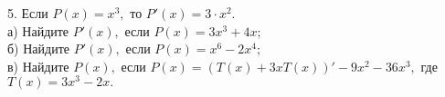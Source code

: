 5. Если $P(x)=x^3,$ то $P'(x)=3\cdot x^2.$\\
а) Найдите $P'(x),$ если $P(x)=3x^3+4x;$\\
б) Найдите $P'(x),$ если $P(x)=x^6-2x^4;$\\
в) Найдите $P(x),$ если $P(x)=(T(x)+3xT(x))'-9x^2-36x^3,$ где $T(x)=3x^3-2x.$\\
